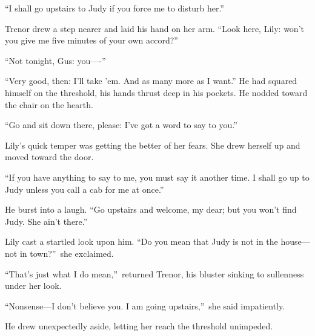 \documentclass[12pt,a4paper]{book}
\begin{document}
``I shall go upstairs to Judy if you force me to disturb her.''





Trenor drew a step nearer and laid his hand on her arm. ``Look
here, Lily: won't you give me five minutes of your own accord?''





``Not tonight, Gus: you----''





``Very good, then: I'll take 'em. And as many more as I want.'' He
had squared himself on the threshold, his hands thrust deep in
his pockets. He nodded toward the chair on the hearth.





``Go and sit down there, please: I've got a word to say to you.''





Lily's quick temper was getting the better of her fears. She drew
herself up and moved toward the door.





``If you have anything to say to me, you must say it another time. 
I shall go up to Judy unless you call a cab for me at once.''





He burst into a laugh. ``Go upstairs and welcome, my dear; but you
won't find Judy. She ain't there.''





Lily cast a startled look upon him. ``Do you mean that Judy is not
in the house---not in town?''\ she exclaimed.





``That's just what I do mean,''\ returned Trenor, his bluster
sinking to sullenness under her look.





``Nonsense---I don't believe you. I am going upstairs,''\ she said
impatiently.





He drew unexpectedly aside, letting her reach the threshold
unimpeded.
\end{document}
